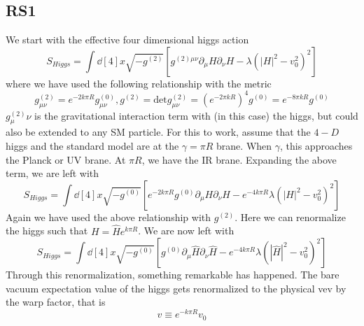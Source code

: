 \documentclass[12pt]{article}
\newcommand{\pd}{\partial}
\begin{document}
\subsection{RS1}
We start with the effective four dimensional higgs action
\begin{equation}
    S_{Higgs} = \int \dd[4]{x}\sqrt{-g^{(2)}} \left[ g^{(2)\mu \nu} \pd_\mu H
    \pd_\nu H - \lambda \left( |H|^2 - v_0^2 \right)^2 \right]
\end{equation}
where we have used the following relationship with the metric
\begin{equation}
    g^{(2)}_{\mu\nu} = e^{-2k\pi R}g^(0)_{\mu\nu}, g^{(2)} = \text{det}
    g_{\mu\nu}^(2) = (e^{-2\pi k R})^4g^{(0)} = e^{-8\pi kR}g^{(0)}
\end{equation}
$g^(2)_\mu\nu$ is the gravitational interaction term with (in this case) the
higgs, but could also be extended to any SM particle. For this to work, assume
that the $4-D$ higgs and the standard model are at the $\gamma = \pi R$ brane.
When $\gamma$, this approaches the Planck or UV brane. At $\pi R$, we have the
IR brane. Expanding the above term, we are left with
\begin{equation}
    S_{Higgs} = \int \dd[4]{x} \sqrt{-g^(0)} \left[ e^{-2k\pi R} g^{(0)} \pd_\mu
    H \pd_\nu H - e^{-4k\pi R} \lambda (|H|^2 - v_0^2 )^2 \right]
\end{equation}
Again we have used the above relationship with $g^{(2)}$. Here we can
renormalize the higgs such that $H = \hat{H}e^{k\pi R}$. We are now left with
\begin{equation}
    S_{Higgs} = \int \dd[4]{x} \sqrt{-g^(0)} \left[ g^{(0)} \pd_\mu
    \hat{H} \pd_\nu \hat{H} - e^{-4k\pi R} \lambda (|\hat{H}|^2 - v_0^2 )^2 \right]
\end{equation}
Through this renormalization, something remarkable has happened. The bare vacuum
expectation value of the higgs gets renormalized to the physical vev by the warp
factor, that is
\begin{equation}
    v \equiv e^{-k\pi R}v_0
\end{equation}
\end{document}
